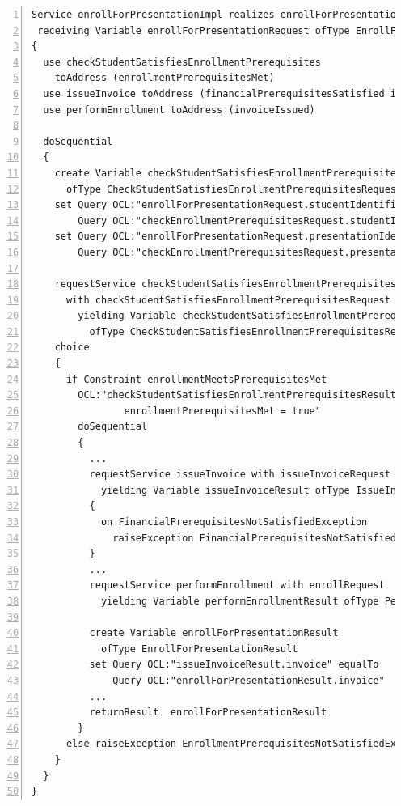 \lstset{language=urdad,caption=Specifying a service in the textual URDAD DSL syntax.,label=serviceTextSyntax}
\small \begin{lstlisting}[numbers=left,escapechar=|]
Service enrollForPresentationImpl realizes enrollForPresentation 
 receiving Variable enrollForPresentationRequest ofType EnrollForPresentationRequest
{
  use checkStudentSatisfiesEnrollmentPrerequisites 
    toAddress (enrollmentPrerequisitesMet)
  use issueInvoice toAddress (financialPrerequisitesSatisfied invoiceIssued) 
  use performEnrollment toAddress (invoiceIssued)
   
  doSequential
  {
    create Variable checkStudentSatisfiesEnrollmentPrerequisitesRequest 
      ofType CheckStudentSatisfiesEnrollmentPrerequisitesRequest               
    set Query OCL:"enrollForPresentationRequest.studentIdentifier" equalTo 
        Query OCL:"checkEnrollmentPrerequisitesRequest.studentIdentifier"
    set Query OCL:"enrollForPresentationRequest.presentationIdentifier" equalTo
        Query OCL:"checkEnrollmentPrerequisitesRequest.presentationIdentifier"
                     
    requestService checkStudentSatisfiesEnrollmentPrerequisites 
      with checkStudentSatisfiesEnrollmentPrerequisitesRequest 
        yielding Variable checkStudentSatisfiesEnrollmentPrerequisitesResult
          ofType CheckStudentSatisfiesEnrollmentPrerequisitesResult
    choice
    {
      if Constraint enrollmentMeetsPrerequisitesMet 
        OCL:"checkStudentSatisfiesEnrollmentPrerequisitesResult.
                enrollmentPrerequisitesMet = true"
        doSequential
        {
          ...
          requestService issueInvoice with issueInvoiceRequest 
            yielding Variable issueInvoiceResult ofType IssueInvoiceResult
          {
            on FinancialPrerequisitesNotSatisfiedException 
              raiseException FinancialPrerequisitesNotSatisfiedException
          }
	      ...
          requestService performEnrollment with enrollRequest 
            yielding Variable performEnrollmentResult ofType PerformEnrollmentResult
          
          create Variable enrollForPresentationResult 
            ofType EnrollForPresentationResult
          set Query OCL:"issueInvoiceResult.invoice" equalTo
              Query OCL:"enrollForPresentationResult.invoice"
          ...                       
          returnResult  enrollForPresentationResult
        }
      else raiseException EnrollmentPrerequisitesNotSatisfiedException
    }
  }
}                 
\end{lstlisting}\normalsize

 
